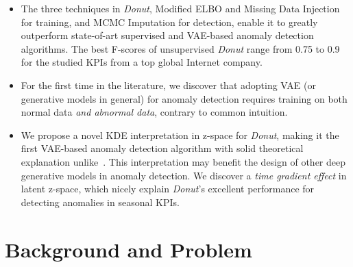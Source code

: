 \documentclass[sigconf]{acmart}
\newcommand{\DONUT}{\textit{Donut}}
\begin{document}
\begin{itemize}

\item The three techniques in \DONUT{}, Modified ELBO and Missing Data Injection for training, and MCMC Imputation for detection, enable it to greatly outperform state-of-art supervised and VAE-based anomaly detection algorithms.  The best F-scores of unsupervised \DONUT{} range from 0.75 to 0.9 for the studied KPIs from a top global Internet company.

\item For the first time in the literature, we discover that adopting VAE (or generative models in general) for anomaly detection requires training on both normal data \textit{and abnormal data}, contrary to common intuition.

\item We propose a novel KDE interpretation in z-space for \DONUT{}, making it the first VAE-based anomaly detection algorithm with solid theoretical explanation unlike~\cite{vae-ad,vi-storn}. This interpretation may benefit the design of other deep generative models in anomaly detection. We discover a \textit{time gradient effect} in latent z-space, which nicely explain \DONUT{}'s excellent performance for detecting anomalies in seasonal KPIs.
\end{itemize}




\section{Background and Problem}
\label{sec:background}
\end{document}

